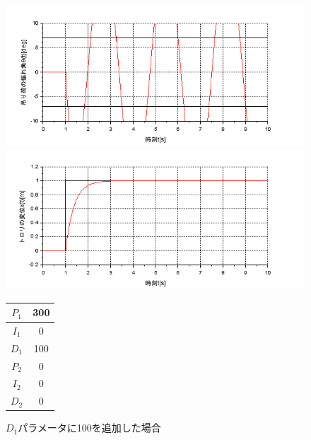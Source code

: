 \documentclass[dvipdfmx,titlepage,a4j]{jsarticle}  %
\begin{document}
\begin{figure}[H]
  \begin{minipage}{4.5cm}
    \centering
    \includegraphics[keepaspectratio, scale=0.35]{../graph/crane/ang-P1-300-I1-0-D1-100-P2-0-I2-0-D2-0.png}
  \end{minipage}
  \hfill
  \begin{minipage}{4.5cm}
    \centering
    \includegraphics[keepaspectratio, scale=0.35]{../graph/crane/po-P1-300-I1-0-D1-100-P2-0-I2-0-D2-0.png}
  \end{minipage}
  \hfill
  \begin{minipage}{3cm}
    \begin{center}
      \begin{tabular}{c|c}
        \hline
        $P_1$ & 300 \\ \hline
        $I_1$ & 0   \\ \hline
        $D_1$ & 100 \\ \hline
        $P_2$ & 0   \\ \hline
        $I_2$ & 0   \\ \hline
        $D_2$ & 0   \\
        \hline
      \end{tabular}
    \end{center}
  \end{minipage}
  \hfill
  \caption{$D_1$パラメータに100を追加した場合}
  \label{fig:crane:5}
\end{figure}
\end{document}
